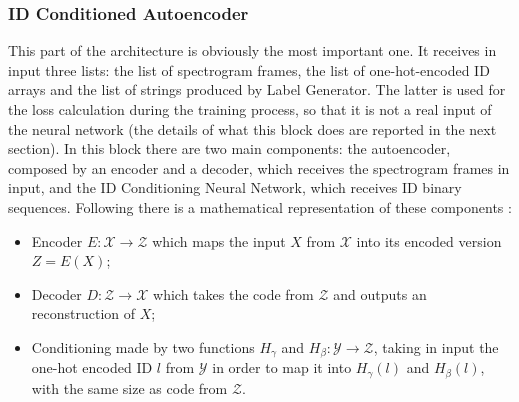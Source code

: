\subsubsection{ID Conditioned Autoencoder}
This part of the architecture is obviously the most important one. It receives in input three lists: the list of spectrogram frames, the list of one-hot-encoded ID arrays and the list of strings produced by Label Generator. The latter is used for the loss calculation during the training process, so that it is not a real input of the neural network (the details of what this block does are reported in the next section). In this block there are two main components: the autoencoder, composed by an encoder and a decoder, which receives the spectrogram frames in input, and the ID Conditioning Neural Network, which receives ID binary sequences. Following there is a mathematical representation of these components \cite{18IDConditionedAutoEncoder}:
\begin{itemize}
    \item {Encoder $E: \mathcal{X} \rightarrow \mathcal{Z}$ which maps the input $X$ from $\mathcal{X}$ into its encoded version $Z = E(X)$;}
    \item {Decoder $D:  \mathcal{Z} \rightarrow \mathcal{X}$ which takes the code from $\mathcal{Z}$ and outputs an reconstruction of $X$; }
    \item {Conditioning made by two functions $H_\gamma$ and $H_\beta: \mathcal{Y} \rightarrow \mathcal{Z}$, taking in input the one-hot encoded ID $l$ from $\mathcal{Y}$ in order to map it into $H_\gamma(l)$ and $H_\beta(l)$, with the same size as code from $\mathcal{Z}$.}
\end{itemize}
